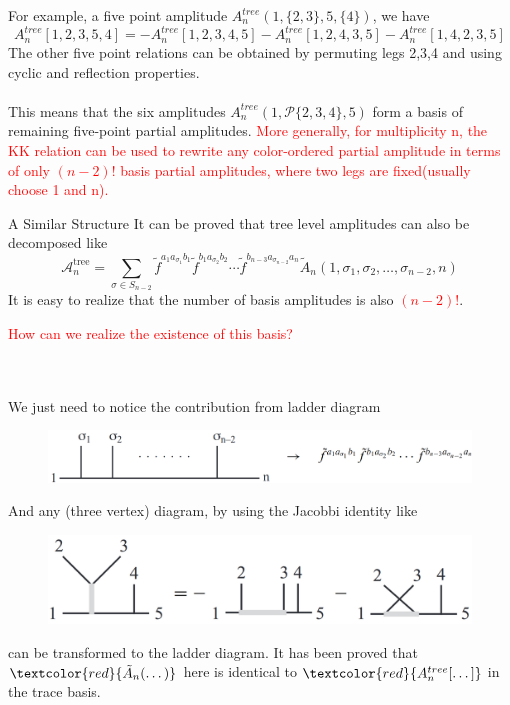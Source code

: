 \documentclass{beamer}
\begin{document}
\begin{frame}
    For example, a five point amplitude $A_n^{tree}(1,\{2,3\},5,\{4\})$, we have
\begin{equation*}
    A_n^{tree}[1,2,3,5,4]=-A_n^{tree}[1,2,3,4,5]-A_n^{tree}[1,2,4,3,5]-A_n^{tree}[1,4,2,3,5]
\end{equation*}
The other five point relations can be obtained by permuting legs 2,3,4 and using cyclic and reflection properties.
\\ \hspace*{\fill}\\
This means that the six amplitudes $A_n^{tree}(1,\mathcal{P}\{2,3,4 \},5 )$ form a basis of remaining five-point partial amplitudes.
\textcolor{red}{More generally, for multiplicity n, the KK relation can be used to rewrite any color-ordered partial amplitude in terms of only $(n-2)!$
basis partial amplitudes, where two legs are fixed(usually choose 1 and n).}
\end{frame}
\begin{frame}{A Similar Structure}
    It can be proved that tree level amplitudes can also be decomposed like 
\begin{equation*}
    \mathcal{A}_n^\text{tree}=\sum_{\sigma\in S_{n-2}}\tilde{f}^{a_1a_{\sigma_1}b_1}\tilde{f}^{b_1a_{\sigma_2}b_2}\cdots\tilde{f}^{b_{n-3}a_{\sigma_{n-2}}a_n}\tilde{A}_n(1,\sigma_1,\sigma_2,\ldots,\sigma_{n-2},n)
\end{equation*}
It is easy to realize that the number of basis amplitudes is also \textcolor{red}{$(n-2)!$}.
\end{frame}
\begin{frame}
    \begin{Large}
        \textcolor{red}{How can we realize the existence of this basis?}
    \end{Large}
\\ \hspace*{\fill}\\
We just need to notice the contribution from ladder diagram
\begin{figure}[htb]
    \centering
    \includegraphics[width=1\linewidth]{1.png}
\end{figure}
And any (three vertex) diagram, by using the Jacobbi identity like 
\begin{figure}[htb]
    \centering
    \includegraphics[width=1\linewidth]{2.png}
\end{figure}
can be transformed to the ladder diagram. It has been proved that $\textcolor{red}{\tilde{A}_n(\dots)}$ here is identical to $\textcolor{red}{A_n^{tree}[\dots]}$ in the trace basis.
\end{frame}
\end{document}
